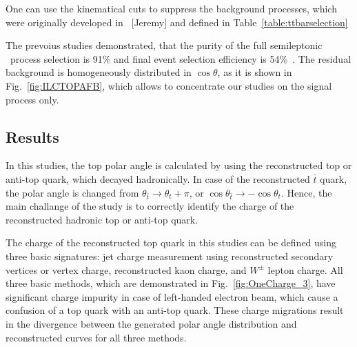 One can use the kinematical cuts to suppress the background processes, which were originally developed in ~\cite{bib:Doublet}[Jeremy] and defined in Table~\ref{table:ttbarselection}

The prevoius studies demonstrated, that the purity of the full semileptonic \ttbar\ process selection is 91\% and final event selection efficiency is 54\%~\cite{bib:ILCTOP}.
The residual background is homogeneously distributed in $\cos\theta$, as it is shown in Fig.~\ref{fig:ILCTOPAFB}, which allows to concentrate our studies on the signal process only. 

\subsection{Results}

In this studies, the top polar angle is calculated by using the reconstructed top or anti-top quark, which decayed hadronically.
In case of the reconstructed $\bar{t}$ quark, the polar angle is changed from $\theta_{\bar{t}} \to \theta_{t} + \pi$, or $\cos\theta_{\bar{t}} \to -\cos\theta_{t}$. 
Hence, the main challange of the study is to correctly identify the charge of the reconstructed hadronic top or anti-top quark. 

The charge of the reconstructed top quark in this studies can be defined using three basic signatures: jet charge measurement using reconstructed secondary vertices or vertex charge, reconstructed kaon charge, and $W^\pm$ lepton charge. 
All three basic methods, which are demonstrated in Fig.~\ref{fig:OneCharge_3}, have significant charge impurity in case of left-handed electron beam, which cause a confusion of a top quark with an anti-top quark.
These charge migrations result in the divergence between the generated polar angle distribution and reconstructed curves for all three methods. 

